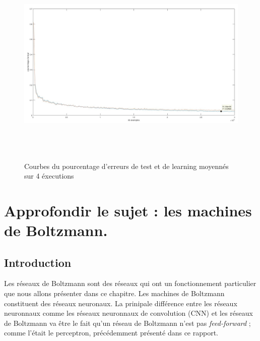 \documentclass[a4paper,twoside]{report}
\begin{document}
\begin{figure}[!h]
	\begin{center}
		\includegraphics[width=17cm,height=10cm]{Images/courbes_moyennes.jpg} 
		\caption{Courbes du pourcentage d'erreurs de test et de learning moyennés sur 4 éxecutions} 
	\end{center}
\end{figure}






\newpage


    \part[Machines de Boltzmann]{Approfondir le sujet : les machines de Boltzmann.}

        \chapter{Introduction}

            Les réseaux de Boltzmann sont des réseaux qui ont un fonctionnement
            particulier que nous allons présenter dans ce chapitre. Les machines de
            Boltzmann constituent des réseaux neuronaux. La prinipale différence entre
            les réseaux neuronnaux comme les réseaux neuronnaux de convolution (CNN) et
            les  réseaux de Boltzmann va être le fait qu'un réseau de Boltzmann n'est
            pas \textit{feed-forward} ; comme l'était le perceptron, précédemment présenté dans ce
            rapport.
\end{document}
